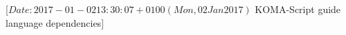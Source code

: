 %
%
%
%
%
%
%
%
% 
%
%
%
%
%
                 [$Date: 2017-01-02 13:30:07 +0100 (Mon, 02 Jan 2017) $
                  KOMA-Script guide language dependencies]
%
%
\RequirePackage[normal]{engord}
%
%
